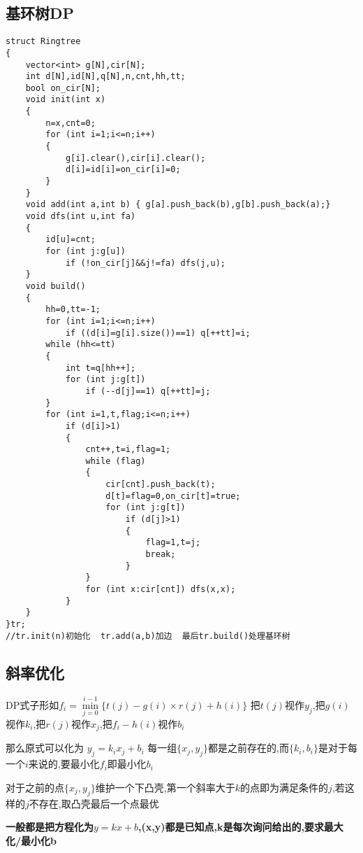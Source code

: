 \documentclass[a4paper]{ctexart}
\begin{document}
\subsection{基环树DP}

\begin{lstlisting}
struct Ringtree
{	
    vector<int> g[N],cir[N];
    int d[N],id[N],q[N],n,cnt,hh,tt;
    bool on_cir[N];
    void init(int x)
    {
        n=x,cnt=0;
        for (int i=1;i<=n;i++)
        {
            g[i].clear(),cir[i].clear();
            d[i]=id[i]=on_cir[i]=0;
        }
    }
    void add(int a,int b) { g[a].push_back(b),g[b].push_back(a);}
    void dfs(int u,int fa)
    {
        id[u]=cnt;
        for (int j:g[u])
            if (!on_cir[j]&&j!=fa) dfs(j,u);
    }
    void build()
    {
        hh=0,tt=-1;
        for (int i=1;i<=n;i++)
            if ((d[i]=g[i].size())==1) q[++tt]=i;
        while (hh<=tt)
        {
            int t=q[hh++];
            for (int j:g[t])
                if (--d[j]==1) q[++tt]=j;
        }
        for (int i=1,t,flag;i<=n;i++)
            if (d[i]>1)
            {
                cnt++,t=i,flag=1;
                while (flag)
                {
                    cir[cnt].push_back(t);
                    d[t]=flag=0,on_cir[t]=true;
                    for (int j:g[t])
                        if (d[j]>1)
                        {
                            flag=1,t=j;
                            break;
                        }
                }
                for (int x:cir[cnt]) dfs(x,x);
            }
    }
}tr;
//tr.init(n)初始化  tr.add(a,b)加边  最后tr.build()处理基环树
\end{lstlisting}

\subsection{斜率优化}

DP式子形如$f_i=\min\limits_{j=0}^{i-1} \{t(j)-g(i)\times r(j)+h(i)\}$ 把$t(j)$视作$y_j$,把$g(i)$视作$k_i$,把$r(j)$视作$x_j$,把$f_i-h(i)$视作$b_i$

那么原式可以化为  $y_j=k_ix_j+b_i$ 每一组$\{x_j,y_j\}$都是之前存在的,而$\{k_i,b_i\}$是对于每一个$i$来说的,要最小化$f_i$即最小化$b_i$

对于之前的点$\{x_j,y_j\}$维护一个下凸壳,第一个斜率大于$k$的点即为满足条件的$j$,若这样的$j$不存在,取凸壳最后一个点最优

\textbf{一般都是把方程化为}$y=kx+b$\textbf{,(x,y)都是已知点,k是每次询问给出的,要求最大化/最小化b}
\end{document}
